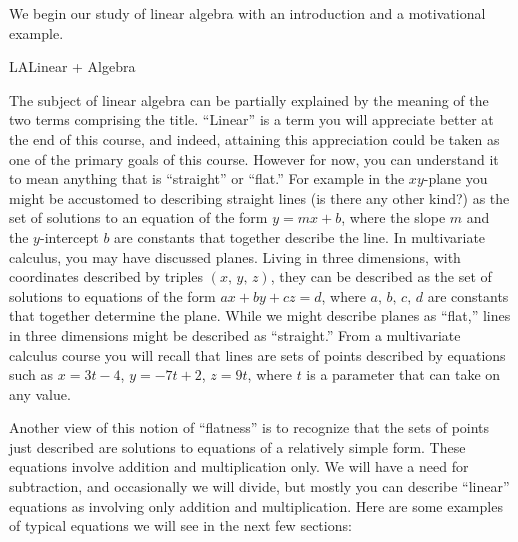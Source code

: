 %
\begin{introduction}
\begin{para}We begin our study of linear algebra with an introduction and a motivational example.\end{para}
\end{introduction}
%
\begin{subsect}{LA}{Linear + Algebra}
%
\begin{para}The subject of linear algebra can be partially explained by the meaning of the two terms comprising the title.  ``Linear'' is a term you will appreciate better at the end of this course, and indeed, attaining this appreciation could be taken as one of the primary goals of this course.  However for now, you can understand it to mean anything that is ``straight'' or ``flat.''  For example in the $xy$-plane you might be accustomed to describing straight lines (is there any other kind?) as the set of solutions to an equation of the form $y = mx + b$, where the slope $m$ and the $y$-intercept $b$ are constants that together describe the line.  In multivariate calculus, you may have discussed planes.  Living in three dimensions, with coordinates described by triples $(x,\,y,\,z)$, they can be described as the set of solutions to equations of the form $ax+by+cz=d$, where $a,\,b,\,c,\,d$ are constants that together determine the plane.  While we might describe planes as ``flat,'' lines in three dimensions might be described as ``straight.''   From a multivariate calculus course you will recall that lines are sets of points described by equations such as $x=3t-4$, $y=-7t+2$, $z=9t$, where $t$ is a parameter that can take on any value.\end{para}
%
\begin{para}Another view of this notion of ``flatness'' is to recognize that the sets of points just described are solutions to equations of a relatively simple form.  These equations involve addition and multiplication only.  We will have a need for subtraction, and occasionally we will divide, but mostly you can describe ``linear'' equations as involving only addition and multiplication.  Here are some examples of typical equations we will see in the next few sections:
%
\begin{align*}

\end{align*}
\end{para}
\end{subsect}
